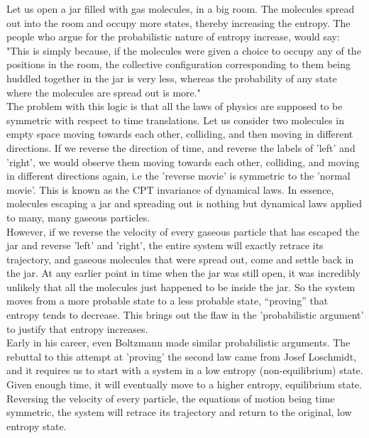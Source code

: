 \documentclass[oneside]{book}
\begin{document}
Let us open a jar filled with gas molecules, in a big room. The molecules spread out into the room and occupy more states, thereby increasing the entropy. The people who argue for the probabilistic nature of entropy increase, would say: "This is simply because, if the molecules were given a choice to occupy any of the positions in the room, the collective configuration corresponding to them being huddled together in the jar is very less, whereas the probability of any state where the molecules are spread out is more."\\

The problem with this logic is that all the laws of physics are supposed to be symmetric with respect to time translations. Let us consider two molecules in empty space moving towards each other, colliding, and then moving in different directions. If we reverse the direction of time, and reverse the labels of 'left' and 'right', we would observe them moving towards each other, colliding, and moving in different directions again, i.e the 'reverse movie' is symmetric to the 'normal movie'. This is known as the CPT invariance of dynamical laws. In essence, molecules escaping a jar and spreading out is nothing but dynamical laws applied to many, many gaseous particles.\\

However, if we reverse the velocity of every gaseous particle that has escaped the jar and reverse 'left' and 'right', the entire system will exactly retrace its trajectory, and gaseous molecules that were spread out, come and settle back in the jar. At any earlier point in time when the jar was still open, it was incredibly unlikely that all the molecules just happened to be inside the jar. So the system moves from a more probable state to a less probable state,  “proving” that entropy tends to decrease. This brings out the flaw in the 'probabilistic argument' to justify that entropy increases.\\

Early in his career, even Boltzmann made similar probabilistic arguments. The rebuttal to this attempt at 'proving' the second law came from Josef Loschmidt, and it requires us to start with a system in a low entropy (non-equilibrium) state. Given enough time, it will eventually move to a higher entropy, equilibrium state. Reversing the velocity of every particle, the equations of motion being time symmetric, the system will retrace its trajectory and return to the original, low entropy state.\\
\end{document}
